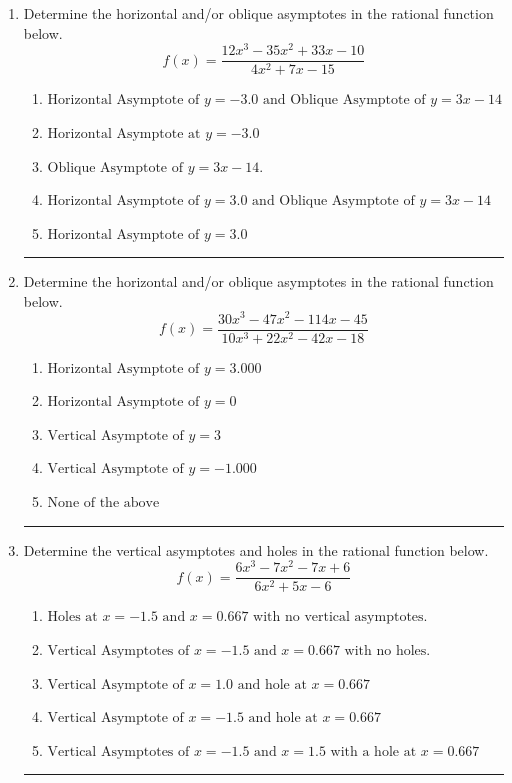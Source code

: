 \documentclass[14pt]{extbook}
\newcommand{\litem}[1]{\item#1\hspace*{-1cm}\rule{\textwidth}{0.4pt}}
\begin{document}
\begin{enumerate}
{\begin{enumerate}[label=\Alph*.]
\end{enumerate} }
\litem{
Determine the horizontal and/or oblique asymptotes in the rational function below.\[ f(x) = \frac{12x^{3} -35 x^{2} +33 x -10}{4x^{2} +7 x -15} \]\begin{enumerate}[label=\Alph*.]
\item \( \text{Horizontal Asymptote of } y = -3.0 \text{ and Oblique Asymptote of } y = 3x -14 \)
\item \( \text{Horizontal Asymptote at } y = -3.0 \)
\item \( \text{Oblique Asymptote of } y = 3x -14. \)
\item \( \text{Horizontal Asymptote of } y = 3.0 \text{ and Oblique Asymptote of } y = 3x -14 \)
\item \( \text{Horizontal Asymptote of } y = 3.0  \)

\end{enumerate} }
\litem{
Determine the horizontal and/or oblique asymptotes in the rational function below.\[ f(x) = \frac{30x^{3} -47 x^{2} -114 x -45}{10x^{3} +22 x^{2} -42 x -18} \]\begin{enumerate}[label=\Alph*.]
\item \( \text{Horizontal Asymptote of } y = 3.000  \)
\item \( \text{Horizontal Asymptote of } y = 0  \)
\item \( \text{Vertical Asymptote of } y = 3  \)
\item \( \text{Vertical Asymptote of } y = -1.000  \)
\item \( \text{None of the above} \)

\end{enumerate} }
\litem{
Determine the vertical asymptotes and holes in the rational function below.\[ f(x) = \frac{6x^{3} -7 x^{2} -7 x + 6}{6x^{2} +5 x -6} \]\begin{enumerate}[label=\Alph*.]
\item \( \text{Holes at } x = -1.5 \text{ and } x = 0.667 \text{ with no vertical asymptotes.} \)
\item \( \text{Vertical Asymptotes of } x = -1.5 \text{ and } x = 0.667 \text{ with no holes.} \)
\item \( \text{Vertical Asymptote of } x = 1.0 \text{ and hole at } x = 0.667 \)
\item \( \text{Vertical Asymptote of } x = -1.5 \text{ and hole at } x = 0.667 \)
\item \( \text{Vertical Asymptotes of } x = -1.5 \text{ and } x = 1.5 \text{ with a hole at } x = 0.667 \)


\end{enumerate}}
\end{enumerate}
\end{document}
